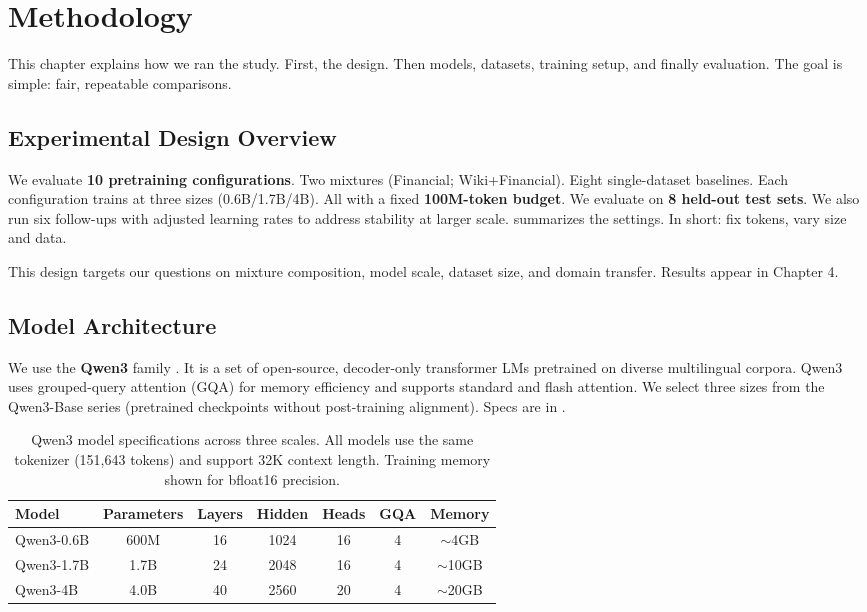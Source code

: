 \chapter{Methodology}

This chapter explains how we ran the study. First, the design. Then models, datasets, training setup, and finally evaluation. The goal is simple: fair, repeatable comparisons.

\section{Experimental Design Overview}

We evaluate \textbf{10 pretraining configurations}. Two mixtures (Financial; Wiki+Financial). Eight single-dataset baselines. Each configuration trains at three sizes (0.6B/1.7B/4B). All with a fixed \textbf{100M-token budget}. We evaluate on \textbf{8 held-out test sets}. We also run six follow-ups with adjusted learning rates to address stability at larger scale.  summarizes the settings. In short: fix tokens, vary size and data.



This design targets our questions on mixture composition, model scale, dataset size, and domain transfer. Results appear in Chapter 4.

\section{Model Architecture}

We use the \textbf{Qwen3} family \parencite{yang2024qwen2}. It is a set of open-source, decoder-only transformer LMs pretrained on diverse multilingual corpora. Qwen3 uses grouped-query attention (GQA) for memory efficiency and supports standard and flash attention. We select three sizes from the Qwen3-Base series (pretrained checkpoints without post-training alignment). Specs are in .

\begin{table}[h]
\centering
\caption[Qwen3 Model Specifications]{Qwen3 model specifications across three scales. All models use the same tokenizer (151,643 tokens) and support 32K context length. Training memory shown for bfloat16 precision.}
\label{tab:model_specs}
\begin{tabular}{lcccccc}
\toprule
\textbf{Model} & \textbf{Parameters} & \textbf{Layers} & \textbf{Hidden} & \textbf{Heads} & \textbf{GQA} & \textbf{Memory} \\
\midrule
Qwen3-0.6B & 600M & 16 & 1024 & 16 & 4 & $\sim$4GB \\
Qwen3-1.7B & 1.7B & 24 & 2048 & 16 & 4 & $\sim$10GB \\
Qwen3-4B & 4.0B & 40 & 2560 & 20 & 4 & $\sim$20GB \\
\bottomrule
\end{tabular}
\end{table}

